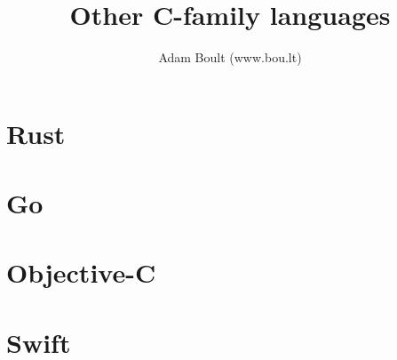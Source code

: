 \documentclass[oneside]{book}
\begin{document}
\author{Adam Boult (www.bou.lt)}
\title{Other C-family languages}
\maketitle

\setcounter{tocdepth}{0}
\tableofcontents



\part{Rust}







\part{Go}

\part{Objective-C}

\part{Swift}
\end{document}
